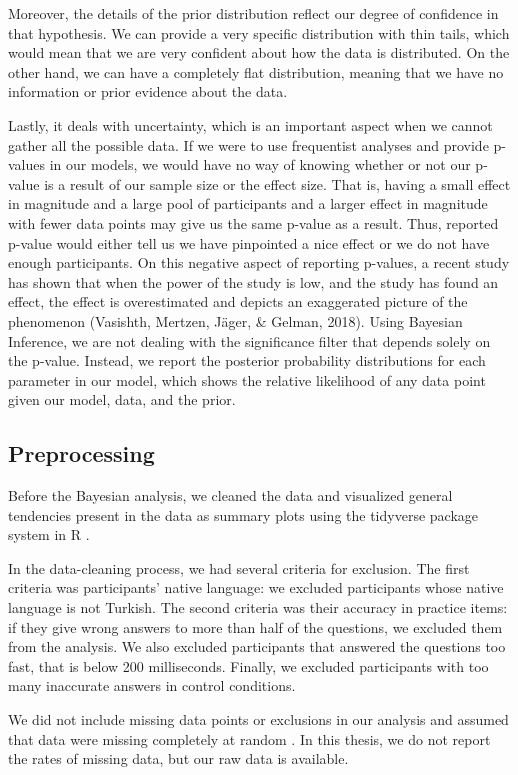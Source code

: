 Moreover, the details of the prior distribution reflect our degree of confidence in that hypothesis. We can provide a very specific distribution with thin tails, which would mean that we are very confident about how the data is distributed. On the other hand, we can have a completely flat distribution, meaning that we have no information or prior evidence about the data. 

Lastly, it deals with uncertainty, which is an important aspect when we cannot gather all the possible data. If we were to use frequentist analyses and provide p-values in our models, we would have no way of knowing whether or not our p-value is a result of our sample size or the effect size. That is, having a small effect in magnitude and a large pool of participants and a larger effect in magnitude with fewer data points may give us the same p-value as a result. Thus, reported p-value would either tell us we have pinpointed a nice effect or we do not have enough participants. On this negative aspect of reporting p-values, a recent study has shown that when the power of the study is low, and the study has found an effect, the effect is overestimated and depicts an exaggerated picture of the phenomenon (Vasishth, Mertzen, J\"ager, \& Gelman, 2018). Using Bayesian Inference, we are not dealing with the significance filter that depends solely on the p-value. Instead, we report the posterior probability distributions for each parameter in our model, which shows the relative likelihood of any data point given our model, data, and the prior. 

\subsection{Preprocessing}
Before the Bayesian analysis, we cleaned the data and visualized general tendencies present in the data as summary plots using the tidyverse package system in R \citep{tidyverse}. 

In the data-cleaning process, we had several criteria for exclusion. The first criteria was participants' native language: we excluded participants whose native language is not Turkish. The second criteria was their accuracy in practice items: if they give wrong answers to more than half of the questions, we excluded them from the analysis. We also excluded participants that answered the questions too fast, that is below 200 milliseconds. Finally, we excluded participants with too many inaccurate answers in control conditions. 

We did not include missing data points or exclusions in our analysis and assumed that data were missing completely at random \citep{VanBuuren2018}. In this thesis, we do not report the rates of missing data, but our raw data is available.

